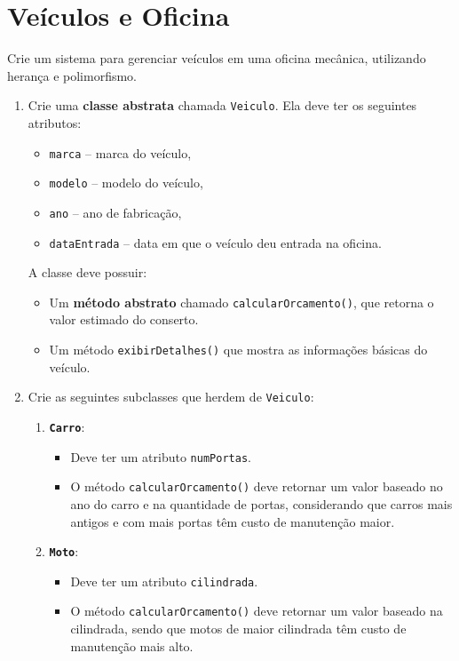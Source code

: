 \documentclass{article}
\begin{document}
\section{Veículos e Oficina}

Crie um sistema para gerenciar veículos em uma oficina mecânica, utilizando herança e polimorfismo.

\begin{enumerate}
    \item Crie uma \textbf{classe abstrata} chamada \texttt{Veiculo}.  
    Ela deve ter os seguintes atributos:
    \begin{itemize}
        \item \texttt{marca} -- marca do veículo,
        \item \texttt{modelo} -- modelo do veículo,
        \item \texttt{ano} -- ano de fabricação,
        \item \texttt{dataEntrada} -- data em que o veículo deu entrada na oficina.
    \end{itemize}

    A classe deve possuir:
    \begin{itemize}
        \item Um \textbf{método abstrato} chamado \texttt{calcularOrcamento()}, que retorna o valor estimado do conserto.
        \item Um método \texttt{exibirDetalhes()} que mostra as informações básicas do veículo.
    \end{itemize}

    \item Crie as seguintes subclasses que herdem de \texttt{Veiculo}:
    \begin{enumerate}
        \item \textbf{\texttt{Carro}}:
        \begin{itemize}
            \item Deve ter um atributo \texttt{numPortas}.
            \item O método \texttt{calcularOrcamento()} deve retornar um valor baseado no ano do carro e na quantidade de portas, considerando que carros mais antigos e com mais portas têm custo de manutenção maior.
        \end{itemize}

        \item \textbf{\texttt{Moto}}:
        \begin{itemize}
            \item Deve ter um atributo \texttt{cilindrada}.
            \item O método \texttt{calcularOrcamento()} deve retornar um valor baseado na cilindrada, sendo que motos de maior cilindrada têm custo de manutenção mais alto.
        \end{itemize}
    \end{enumerate}


\end{enumerate}
\end{document}
